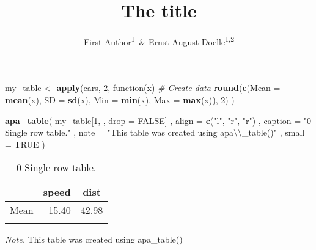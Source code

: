 \documentclass[english,man]{apa6}
\title{The title}
\author{First Author\textsuperscript{1}~\& Ernst-August Doelle\textsuperscript{1,2}}
\affiliation{
    \vspace{0.5cm}
          \textsuperscript{1} Wilhelm-Wundt-University\\
          \textsuperscript{2} Konstanz Business School  }
\newenvironment{Shaded}{\begin{snugshade}}{\end{snugshade}}
\newcommand{\KeywordTok}[1]{\textcolor[rgb]{0.13,0.29,0.53}{\textbf{{#1}}}}
\newcommand{\DataTypeTok}[1]{\textcolor[rgb]{0.13,0.29,0.53}{{#1}}}
\newcommand{\DecValTok}[1]{\textcolor[rgb]{0.00,0.00,0.81}{{#1}}}
\newcommand{\CharTok}[1]{\textcolor[rgb]{0.31,0.60,0.02}{{#1}}}
\newcommand{\StringTok}[1]{\textcolor[rgb]{0.31,0.60,0.02}{{#1}}}
\newcommand{\CommentTok}[1]{\textcolor[rgb]{0.56,0.35,0.01}{\textit{{#1}}}}
\newcommand{\OtherTok}[1]{\textcolor[rgb]{0.56,0.35,0.01}{{#1}}}
\newcommand{\NormalTok}[1]{{#1}}
\theoremstyle{definition}
\theoremstyle{definition}
\theoremstyle{definition}
\theoremstyle{remark}
\begin{document}
\maketitle

\setcounter{secnumdepth}{0}



\begin{Shaded}
\begin{Highlighting}[]
\NormalTok{my_table <-}\StringTok{ }\KeywordTok{apply}\NormalTok{(cars, }\DecValTok{2}\NormalTok{, function(x) }\CommentTok{# Create data}
  \KeywordTok{round}\NormalTok{(}\KeywordTok{c}\NormalTok{(}\DataTypeTok{Mean =} \KeywordTok{mean}\NormalTok{(x), }\DataTypeTok{SD =} \KeywordTok{sd}\NormalTok{(x), }\DataTypeTok{Min =} \KeywordTok{min}\NormalTok{(x), }\DataTypeTok{Max =} \KeywordTok{max}\NormalTok{(x)), }\DecValTok{2}\NormalTok{)}
\NormalTok{)}

\KeywordTok{apa_table}\NormalTok{(}
  \NormalTok{my_table[}\DecValTok{1}\NormalTok{, , }\DataTypeTok{drop =} \OtherTok{FALSE}\NormalTok{]}
  \NormalTok{, }\DataTypeTok{align =} \KeywordTok{c}\NormalTok{(}\StringTok{"l"}\NormalTok{, }\StringTok{"r"}\NormalTok{, }\StringTok{"r"}\NormalTok{)}
  \NormalTok{, }\DataTypeTok{caption =} \StringTok{"0 Single row table."}
  \NormalTok{, }\DataTypeTok{note =} \StringTok{"This table was created using apa}\CharTok{\textbackslash{}\textbackslash{}}\StringTok{_table()"}
  \NormalTok{, }\DataTypeTok{small =} \OtherTok{TRUE}
\NormalTok{)}
\end{Highlighting}
\end{Shaded}

\begin{table}[tbp]
\begin{center}
\begin{threeparttable}
\caption{\label{tab:unnamed-chunk-2}0 Single row table.}
\small{
\begin{tabular}{lrr}
\toprule
 & \multicolumn{1}{c}{speed} & \multicolumn{1}{c}{dist}\\
\midrule
Mean & 15.40 & 42.98\\
\bottomrule
\addlinespace
\end{tabular}
}
\begin{tablenotes}[para]
\textit{Note.} This table was created using apa\_table()
\end{tablenotes}
\end{threeparttable}
\end{center}
\end{table}
\end{document}
